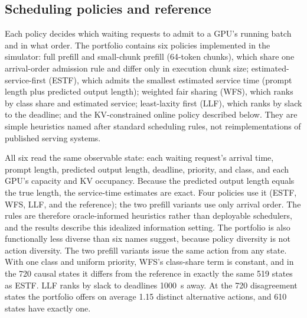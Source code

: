 \documentclass[preprint,12pt]{elsarticle}
\begin{document}
\subsection{Scheduling policies and reference}
\label{sec:policies}
Each policy decides which waiting requests to admit to a GPU's running batch and
in what order. The portfolio contains six policies implemented in the simulator:
full prefill and small-chunk prefill (64-token chunks), which share one
arrival-order admission rule and differ only in execution chunk size;
estimated-service-first (ESTF), which admits the smallest estimated service time
(prompt length plus predicted output length); weighted fair sharing (WFS), which
ranks by class share and estimated service; least-laxity first (LLF), which
ranks by slack to the deadline; and the KV-constrained online policy described
below. They are simple heuristics named after standard scheduling rules, not
reimplementations of published serving systems.

All six read the same observable state: each waiting request's arrival time,
prompt length, predicted output length, deadline, priority, and class, and each
GPU's capacity and KV occupancy. Because the predicted output length equals the
true length, the service-time estimates are exact. Four policies use it (ESTF,
WFS, LLF, and the reference); the two prefill variants use only arrival order.
The rules are therefore oracle-informed heuristics rather than deployable
schedulers, and the results describe this idealized information setting. The
portfolio is also functionally less diverse than six names suggest, because policy
diversity is not action diversity. The two
prefill variants issue the same action from any state. With one class and
uniform priority, WFS's class-share term is constant, and in the 720 causal
states it differs from the reference in exactly the same 519 states as ESTF.
LLF ranks by slack to deadlines 1000~s away. At the 720 disagreement states the
portfolio offers on average 1.15 distinct alternative actions, and 610 states
have exactly one.
\end{document}
